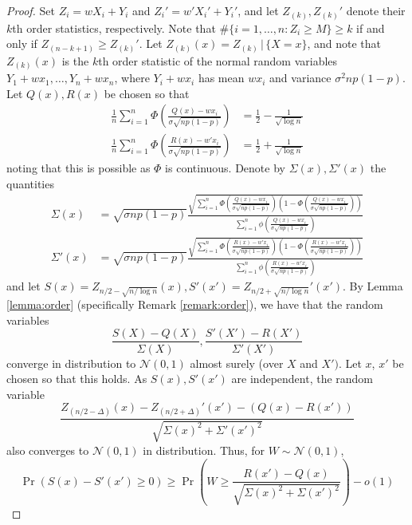 \documentclass{article}
\theoremstyle{remark}
\newcommand{\1}{\mathbbm{1}}
\newcommand{\cond}{\, | \,}
\begin{document}
\begin{proof}
    Set $Z_i = wX_i + Y_i$ and $Z_i' = w'X_i' + Y_i'$, and let $Z_{(k)}, Z_{(k)}'$ denote their $k$th order statistics, respectively. Note that $\#\{i=1,\ldots,n \colon Z_i \ge M\} \ge k$ if and only if $Z_{(n-k+1)} \ge Z_{(k)}'$. Let $Z_{(k)}(x) = Z_{(k)} \cond \{X = x\}$, and note that $Z_{(k)}(x)$ is the $k$th order statistic of the normal random variables $Y_1 + w x_1, \ldots, Y_n + w x_n$, where $Y_i + wx_i$ has mean $wx_i$ and variance $\sigma^2 np(1-p)$.
    Let $Q(x), R(x)$ be chosen so that
    \begin{align*}
        \frac{1}{n} \sum_{i=1}^n \Phi\left(\frac{Q(x) - wx_i}{\sigma \sqrt{np(1-p)}}\right) &= \frac{1}{2} - \frac{1}{\sqrt{\log n}}\\
        \frac{1}{n} \sum_{i=1}^n \Phi\left(\frac{R(x) - w' x_i}{\sigma \sqrt{np(1-p)}}\right) &= \frac{1}{2} + \frac{1}{\sqrt{\log n}}
    \end{align*}
    noting that this is possible as $\Phi$ is continuous. 
    Denote by $\Sigma(x), \Sigma'(x)$ the quantities
    \begin{align*}
        \Sigma(x) &= \sqrt{\sigma np(1-p)} \frac{\sqrt{\sum_{i=1}^n \Phi\left(\frac{Q(x) - wx_i}{\sigma \sqrt{np(1-p)}}\right)\left(1-\Phi\left(\frac{Q(x) - wx_i}{\sigma \sqrt{np(1-p)}}\right)\right)}}{\sum_{i=1}^n \phi\left(\frac{Q(x) - wx_i}{\sigma \sqrt{np(1-p)}}\right)}\\
        \Sigma'(x) &= \sqrt{\sigma np(1-p)} \frac{\sqrt{\sum_{i=1}^n \Phi\left(\frac{R(x) - w' x_i}{\sigma \sqrt{np(1-p)}}\right)\left(1-\Phi\left(\frac{R(x) - w' x_i}{\sigma \sqrt{np(1-p)}}\right)\right)}}{\sum_{i=1}^n \phi\left(\frac{R(x) - w' x_i}{\sigma \sqrt{np(1-p)}}\right)}
    \end{align*}
    and let $S(x) = Z_{n/2 - \sqrt{n / \log n}}(x), S'(x') = Z_{n/2+\sqrt{n/\log n}}'(x')$.
    By Lemma \ref{lemma:order} (specifically Remark \ref{remark:order}), we have that the random variables
    \[\frac{S(X) - Q(X)}{\Sigma(X)}, \frac{S'(X') - R(X')}{\Sigma'(X')}\]
    converge in distribution to $\mathcal N(0, 1)$ almost surely (over $X$ and $X')$. Let $x$, $x'$ be chosen so that this holds. As $S(x), S'(x')$ are independent, the random variable
    \[\frac{Z_{(n/2-\Delta)}(x) - Z_{(n/2+\Delta)}'(x') - (Q(x) - R(x'))}{\sqrt{\Sigma(x)^2 + \Sigma'(x')^2}}\]
    also converges to $\mathcal N(0, 1)$ in distribution.
    Thus, for $W \sim \mathcal N(0, 1)$, 
    \[\Pr(S(x) - S'(x') \ge 0) \ge \Pr\left(W \ge \frac{R(x') - Q(x)}{\sqrt{\Sigma(x)^2 + \Sigma(x')^2}}\right) - o(1)\]

\end{proof}
\end{document}
